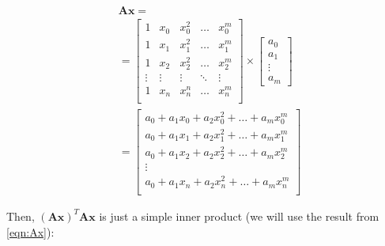 \documentclass{article}
\newcommand{\x}{\mathbf{x}}
\newcommand{\A}{\mathbf{A}}
\begin{document}
\begin{equation} \label{eqn:Ax}
\begin{split}
    & \A\x = \\
    & =
    \begin{bmatrix}
        1 & x_0 & x_0 ^2 & \ldots & x_0^m \\
        1 & x_1 & x_1 ^2 & \ldots & x_1^m \\
        1 & x_2 & x_2 ^2 & \ldots & x_2^m \\
        \vdots & \vdots & \vdots & \ddots & \vdots \\
        1 & x_n & x_n ^n & \ldots & x_n^m \\
    \end{bmatrix}
    \times
    \begin{bmatrix}
        a_0\\
        a_1\\
        \vdots\\
        a_m
    \end{bmatrix}\\
    & =
    \begin{bmatrix}
        a_0 + a_1 x_0 + a_2 x_0 ^2 + \ldots + a_m x_0^m \\
        a_0 + a_1 x_1 + a_2 x_1 ^2 + \ldots + a_m x_1^m \\
        a_0 + a_1 x_2 + a_2 x_2 ^2 + \ldots + a_m x_2^m \\
        \vdots \\
        a_0 + a_1 x_n + a_2 x_n ^2 + \ldots + a_m x_n^m \\
    \end{bmatrix}
\end{split}
\end{equation}

Then, $(\A\x)^T \A\x$ is just a simple inner product (we will use the result from \ref{eqn:Ax}):
\end{document}
